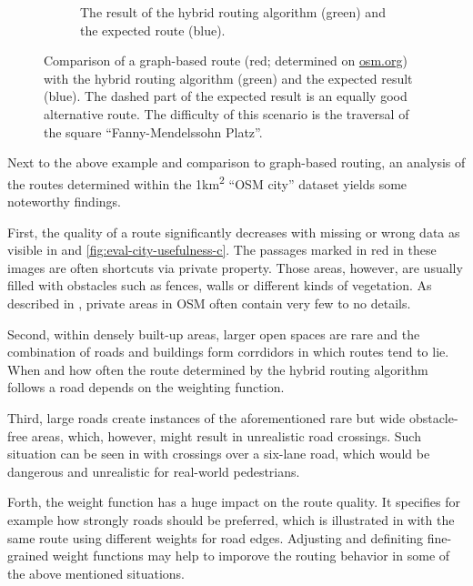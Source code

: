 \begin{figure}[h!]
\begin{minipage}[t]{.48\textwidth}
\begin{subfigure}[t]{\linewidth}
\begin{figcenter}
						\end{figcenter}
						\caption{The result of the hybrid routing algorithm (green) and the expected route (blue).}
						\label{fig:eval-osterstrasse-actual-expected}
					\end{subfigure}
				\end{minipage}
				\caption{Comparison of a graph-based route (red; determined on \href{https://www.openstreetmap.org/directions?engine=fossgis\_osrm\_foot\&route=53.57657\%2C9.95210\%3B53.57601\%2C9.95268\#map=19/53.57632/9.95218}{osm.org}) with the hybrid routing algorithm (green) and the expected result (blue). The dashed part of the expected result is an equally good alternative route. The difficulty of this scenario is the traversal of the square \enquote{Fanny-Mendelssohn Platz}.}
				\label{fig:eval-osterstrasse}
			\end{figure}
			
			Next to the above example and comparison to graph-based routing, an analysis of the routes determined within the 1km\textsuperscript{2} \enquote{OSM city} dataset yields some noteworthy findings.
			
			First, the quality of a route significantly decreases with missing or wrong data as visible in  and \ref{fig:eval-city-usefulness-c}.
			The passages marked in red in these images are often shortcuts via private property.
			Those areas, however, are usually filled with obstacles such as fences, walls or different kinds of vegetation.
			As described in , private areas in OSM often contain very few to no details.
			
			Second, within densely built-up areas, larger open spaces are rare and the combination of roads and buildings form corrdidors in which routes tend to lie.
			When and how often the route determined by the hybrid routing algorithm follows a road depends on the weighting function.
			
			Third, large roads create instances of the aforementioned rare but wide obstacle-free areas, which, however, might result in unrealistic road crossings.
			Such situation can be seen in  with crossings over a six-lane road, which would be dangerous and unrealistic for real-world pedestrians.
			
			Forth, the weight function has a huge impact on the route quality.
			It specifies for example how strongly roads should be preferred, which is illustrated in  with the same route using different weights for road edges.
			Adjusting and definiting fine-grained weight functions may help to imporove the routing behavior in some of the above mentioned situations.
			
